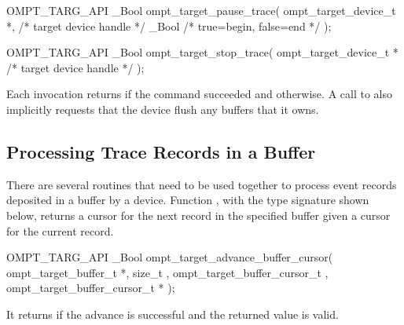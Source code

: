 \documentclass{article}
\begin{document}
\begin{boxedcode}
OMPT\_TARG\_API \_Bool ompt\_target\_pause\_trace(
  ompt\_target\_device\_t *,                     /* target device handle       */
  \_Bool                                  /* true=begin, false=end      */
);
\end{boxedcode}

\begin{boxedcode}
OMPT\_TARG\_API \_Bool ompt\_target\_stop\_trace(
  ompt\_target\_device\_t *                      /* target device handle       */
);
\end{boxedcode}
\noindent
Each invocation returns  if the command succeeded and  otherwise.
A call to  also implicitly requests that the device flush any buffers that it owns.


\subsection{Processing Trace Records in a Buffer}
\label{sec:record-data}

There are several routines that need to be used together to process %
event records deposited in a buffer by a device. Function , with the type signature shown below, returns a cursor for the next record in the specified buffer given a cursor for the current record.

\begin{boxedcode}
OMPT\_TARG\_API \_Bool ompt\_target\_advance\_buffer\_cursor(
  ompt\_target\_buffer\_t *,
  size\_t , 
  ompt\_target\_buffer\_cursor\_t , 
  ompt\_target\_buffer\_cursor\_t *
); 
\end{boxedcode}
It returns  if the advance is successful and the returned value  is valid.
\end{document}
